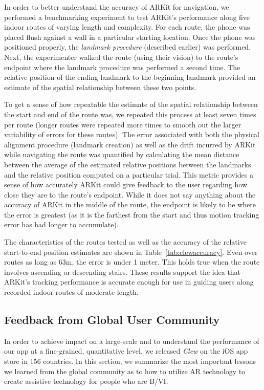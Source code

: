 \documentclass[chi_draft]{sigchi}
\newcommand{\BVI}{B/VI\xspace}
\begin{document}
In order to better understand the accuracy of ARKit for navigation, we performed a benchmarking experiment to test ARKit's performance along five indoor routes of varying length and complexity.  For each route, the phone was placed flush against a wall in a particular starting location.  Once the phone was positioned properly, the \emph{landmark procedure} (described earlier) was performed.  Next, the experimenter walked the route (using their vision) to the route's endpoint where the landmark procedure was  performed a second time.  The relative position of the ending landmark to the beginning landmark provided an estimate of the spatial relationship between these two points.

To get a sense of how repeatable the estimate of the spatial relationship between the start and end of the route was, we repeated this process at least seven times per route (longer routes were repeated more times to smooth out the larger variability of errors for these routes).  The error associated with both the physical alignment procedure (landmark creation) as well as the drift incurred by ARKit while navigating the route was quantified by calculating the mean distance between the average of the estimated relative positions between the landmarks and the relative position computed on a particular trial.  This metric provides a sense of how accurately ARKit could give feedback to the user regarding how close they are to the route's endpoint.  While it does not say anything about the accuracy of ARKit in the middle of the route, the endpoint is likely to be where the error is greatest (as it is the farthest from the start and thus motion tracking error has had longer to accumulate).

The characteristics of the routes tested as well as the accuracy of the relative start-to-end position estimates are shown in Table~\ref{tab:clewaccuracy}.  Even over routes as long as 63m, the error is under 1 meter.  This holds true  when the route involves ascending or descending stairs.  These results support the idea that ARKit's tracking performance is accurate enough for use in guiding users along recorded indoor routes of moderate length.

\subsection{Feedback from Global User Community}
In order to achieve impact on a large-scale and to understand the performance of our app at a fine-grained, quantitative level, we released \emph{Clew} on the iOS app store in 156 countries.  In this section, we summarize the most important lessons we learned from the global community as to how to utilize AR technology to create assistive technology for people who are \BVI.
\end{document}
